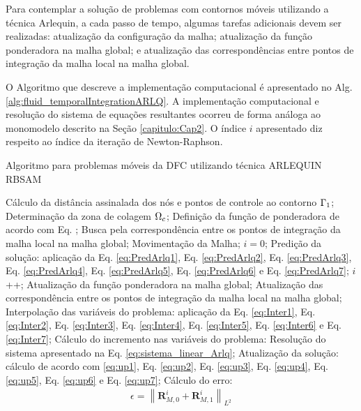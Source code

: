 \documentclass[tese_patricia]{subfiles}
\begin{document}
Para contemplar a solução de problemas com contornos móveis utilizando a técnica Arlequin, a cada passo de tempo, algumas tarefas adicionais devem ser realizadas: atualização da configuração da malha; atualização da função ponderadora na malha global; e atualização das correspondências entre pontos de integração da malha local na malha global.

O Algoritmo que descreve a implementação computacional é apresentado no Alg. \ref{alg:fluid_temporalIntegrationARLQ}. A implementação computacional e resolução do sistema de equações resultantes ocorreu de forma análoga ao monomodelo descrito na Seção \ref{capitulo:Cap2}. O índice $i$ apresentado diz respeito ao índice da iteração de Newton-Raphson.

\begin{algorithm}
	\caption{Algoritmo para problemas móveis da DFC utilizando técnica ARLEQUIN RBSAM}
	\label{alg:fluid_temporalIntegrationARLQ}
	\begin{algorithmic}[1]
		\State Cálculo da distância assinalada dos nós e pontos de controle ao contorno $\Gamma_{1}$;
		\State Determinação da zona de colagem $\Omega_c$;
		\State Definição da função de ponderadora de acordo com Eq. ;
		\State Busca pela correspondência entre os pontos de integração da malha local na malha global;
		\State Movimentação da Malha;
		\State $i=0$;
		\State Predição da solução: aplicação da Eq. \eqref{eq:PredArlq1}, Eq. \eqref{eq:PredArlq2}, Eq. \eqref{eq:PredArlq3},
		Eq. \eqref{eq:PredArlq4}, Eq. \eqref{eq:PredArlq5}, Eq. \eqref{eq:PredArlq6} e Eq. \eqref{eq:PredArlq7};
		\State $i$++;
		\State Atualização da função ponderadora na malha global;
		\State Atualização das correspondência entre os pontos de integração da malha local na malha global;
		\State Interpolação das variáveis do problema: aplicação da Eq. \eqref{eq:Inter1}, Eq. \eqref{eq:Inter2}, Eq. \eqref{eq:Inter3},
		Eq. \eqref{eq:Inter4}, Eq. \eqref{eq:Inter5}, Eq. \eqref{eq:Inter6} e Eq. \eqref{eq:Inter7}; 
		\State Cálculo do incremento nas variáveis do problema: Resolução do sistema apresentado na Eq. \eqref{eq:sistema_linear_Arlq};
		\State Atualização da solução: cálculo de acordo com \eqref{eq:up1}, Eq. \eqref{eq:up2}, Eq. \eqref{eq:up3},
		Eq. \eqref{eq:up4}, Eq. \eqref{eq:up5}, Eq. \eqref{eq:up6} e Eq. \eqref{eq:up7};
		\State Cálculo do erro:
		\begin{align}
			\epsilon =\left\| \mathbf{R}_{M,0}^{i} + \mathbf{R}_{M,1}^{i}  \right\|_{L^2}
		\end{align}
		\EndWhile
		\EndFor
	\end{algorithmic}
\end{algorithm}
\end{document}

